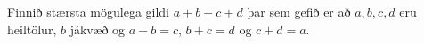 Finnið stærsta mögulega gildi $a+b+c+d$ þar sem gefið er að $a,b,c,d$ eru heiltölur, $b$ jákvæð og $a+b=c$, $b+c=d$ og $c+d=a$.